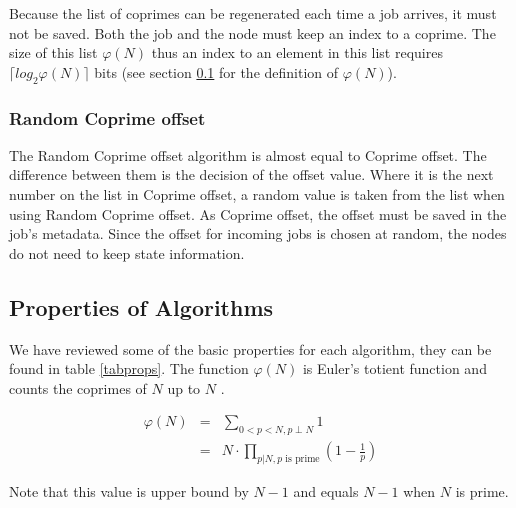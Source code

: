 \documentclass[10pt,a4paper]{article}
\begin{document}
Because the list of coprimes can be regenerated each time a job arrives, it must not be saved. Both the job and the node must keep an index to a coprime. The size of this list $\varphi(N)$ thus an index to an element in this list requires $\lceil log_2 \varphi(N) \rceil$ bits (see section \ref{secprops} for the definition of $\varphi(N)$).

\subsubsection*{Random Coprime offset}
The Random Coprime offset algorithm is almost equal to Coprime offset. The difference between them is the decision of the offset value. Where it is the next number on the list in Coprime offset, a random value is taken from the list when using Random Coprime offset. As Coprime offset, the offset must be saved in the job's metadata. Since the offset for incoming jobs is chosen at random, the nodes do not need to keep state information.

\subsection{Properties of Algorithms}
\label{secprops}

We have reviewed some of the basic properties for each algorithm, they can be found in table \ref{tabprops}. The function $\varphi(N)$ is Euler's totient function and counts the coprimes of $N$ up to $N$ \cite{EULER}.

\begin{eqnarray}
\varphi(N) &=& \sum_{0 < p < N, p \perp N} 1 \nonumber \\
&=&  N \cdot \prod_{p|N, p\text{ is prime}} (1-\frac{1}{p}) \nonumber
\end{eqnarray}

Note that this value is upper bound by $N-1$ and equals $N-1$ when $N$ is prime.
\end{document}
